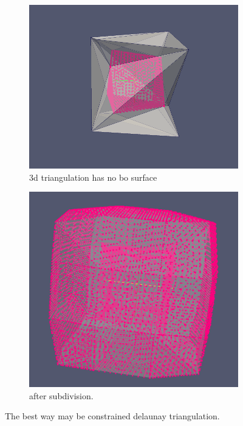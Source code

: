 \documentclass{article}
\theoremstyle{definition}
\theoremstyle{remark}
\begin{document}
  \begin{figure}[h]
    \begin{subfigure}[b]{0.5\textwidth}
        \includegraphics[width=\textwidth]{init_judge_points_0.png}
        \caption[a]{3d triangulation has no bo surface}
    \end{subfigure}
    \begin{subfigure}[b]{0.5\textwidth}
        \includegraphics[width=\textwidth]{init_judge_points_1.png}
        \caption[a]{after subdivision.}
    \end{subfigure}
    \caption{The best way may be constrained delaunay triangulation.}
  \end{figure}
\end{document}
